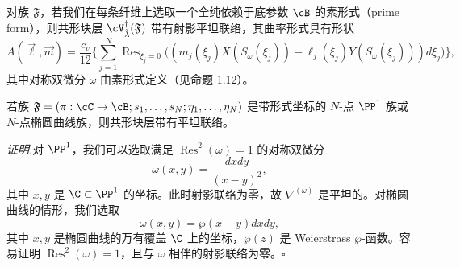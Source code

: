 

\begin{theorem}[5.6]
 对族 $\mathfrak F$，若我们在每条纤维上选取一个全纯依赖于底参数 $\cB$ 的素形式（prime form），则共形块层 $\cV^\dagger_{\tilde\lambda}(\mathfrak F)$ 带有射影平坦联络，其曲率形式具有形状
 \[
  A(\vec\ell,\vec m)=\frac{c_v}{12}\Big\{\sum_{j=1}^{N}\operatorname{Res}_{\xi_j=0}
  \big((m_j(\xi_j)X(S_\omega(\xi_j))-\ell_j(\xi_j)Y(S_\omega(\xi_j)))d\xi_j\big)\Big\},
 \]
 其中对称双微分 $\omega$ 由素形式定义（见命题 1.12）。
\end{theorem}

\begin{corollary}[5.7]
 若族 $\mathfrak F=(\pi:\cC\to\cB;s_1,\dots,s_N;\eta_1,\dots,\eta_N)$ 是带形式坐标的 $N$-点 $\PP^1$ 族或 $N$-点椭圆曲线族，则共形块层带有平坦联络。
\end{corollary}

\noindent\textit{证明.}\quad 对 $\PP^1$，我们可以选取满足 $\operatorname{Res}^2(\omega)=1$ 的对称双微分
\[
 \omega(x,y)=\frac{dxdy}{(x-y)^2},
\]
其中 $x,y$ 是 $\C\subset\PP^1$ 的坐标。此时射影联络为零，故 $\nabla^{(\omega)}$ 是平坦的。对椭圆曲线的情形，我们选取
\[
 \omega(x,y)=\wp(x-y)dxdy,
\]
其中 $x,y$ 是椭圆曲线的万有覆盖 $\C$ 上的坐标，$\wp(z)$ 是 Weierstrass $\wp$-函数。容易证明 $\operatorname{Res}^2(\omega)=1$，且与 $\omega$ 相伴的射影联络为零。\hfill$\square$


